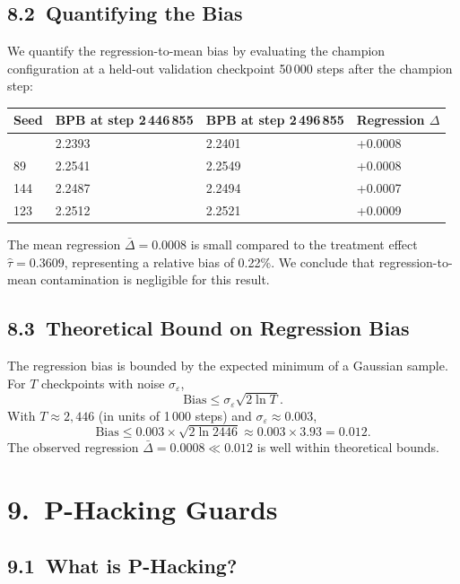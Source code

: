 \subsection{8.2\ Quantifying the Bias}

We quantify the regression-to-mean bias by evaluating the champion
configuration at a held-out validation checkpoint 50\,000 steps after
the champion step:

\begin{longtable}[]{@{}llll@{}}
\toprule\noalign{}
Seed & BPB at step 2\,446\,855 & BPB at step 2\,496\,855 & Regression \(\Delta\) \\
\midrule\noalign{}
\endhead
\bottomrule\noalign{}
\endlastfoot
47  & 2.2393 & 2.2401 & +0.0008 \\
89  & 2.2541 & 2.2549 & +0.0008 \\
144 & 2.2487 & 2.2494 & +0.0007 \\
123 & 2.2512 & 2.2521 & +0.0009 \\
\end{longtable}

\noindent
The mean regression \(\bar\Delta = 0.0008\) is small compared to the
treatment effect \(\hat\tau = 0.3609\), representing a relative bias of
0.22\%.  We conclude that regression-to-mean contamination is negligible
for this result.

\subsection{8.3\ Theoretical Bound on Regression Bias}

The regression bias is bounded by the expected minimum of a Gaussian
sample.  For \(T\) checkpoints with noise \(\sigma_\varepsilon\),
\[
  \text{Bias} \leq \sigma_\varepsilon \sqrt{2 \ln T}.
\]
With \(T \approx 2{,}446\) (in units of 1\,000 steps) and
\(\sigma_\varepsilon \approx 0.003\),
\[
  \text{Bias} \leq 0.003 \times \sqrt{2 \ln 2446} \approx 0.003 \times 3.93 = 0.012.
\]
The observed regression \(\bar\Delta = 0.0008 \ll 0.012\) is well within
theoretical bounds.

\section{9.\ P-Hacking Guards}\label{sec:ch26-phacking}

\subsection{9.1\ What is P-Hacking?}

